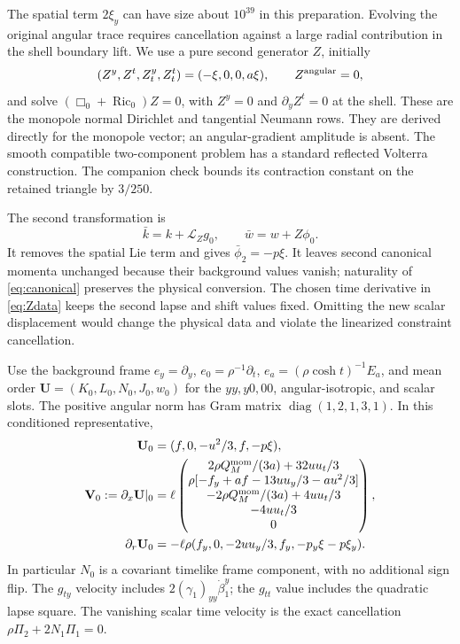 \documentclass[11pt]{article}
\newcommand{\Lie}{\mathcal L}
\begin{document}
The spatial term $2\xi_y$ can have size about $10^{39}$ in this
preparation. Evolving the original angular trace requires cancellation
against a large radial contribution in the shell boundary lift. We use
a pure second generator $Z$, initially
\begin{equation}
 (Z^y,Z^t,Z^y_t,Z^t_t)=(-\xi,0,0,a\xi),\qquad Z^{\rm angular}=0,
 \label{eq:Zdata}
\end{equation}
and solve $(\Box_0+\operatorname{Ric}_0)Z=0$, with
$Z^y=0$ and $\partial_yZ^t=0$ at the shell. These are the monopole
normal Dirichlet and tangential Neumann rows. They are derived directly
for the monopole vector; an angular-gradient amplitude is absent.
The smooth compatible two-component problem has a standard reflected
Volterra construction. The companion check bounds its contraction
constant on the retained triangle by $3/250$.

The second transformation is
\begin{equation}
 \bar k=k+\Lie_Zg_0,\qquad \bar w=w+Z\phi_0. \label{eq:secondgauge}
\end{equation}
It removes the spatial Lie term and gives $\bar\phi_2=-p\xi$.
It leaves second canonical momenta unchanged because their background
values vanish; naturality of \eqref{eq:canonical} preserves the physical
conversion. The chosen time derivative in \eqref{eq:Zdata} keeps the
second lapse and shift values fixed. Omitting the new scalar displacement
would change the physical data and violate the linearized constraint
cancellation.

Use the background frame $e_y=\partial_y$, $e_0=\rho^{-1}\partial_t$,
$e_a=(\rho\cosh t)^{-1}E_a$, and mean order
$\mathbf U=(K_0,L_0,N_0,J_0,w_0)$ for the $yy,y0,00$, angular-isotropic,
and scalar slots. The positive angular norm has Gram matrix
$\operatorname{diag}(1,2,1,3,1)$. In this conditioned representative,
\begin{align}
 \mathbf U_0&=(f,0,-u^2/3,f,-p\xi), \label{eq:U0}\\
 \mathbf V_0:=\partial_x\mathbf U|_0
 &=\ell\begin{pmatrix}
 2\rho Q_M^{\rm mom}/(3a)+32uu_t/3\\
 \rho[-f_y+af-13uu_y/3-au^2/3]\\
 -2\rho Q_M^{\rm mom}/(3a)+4uu_t/3\\
 -4uu_t/3\\0
 \end{pmatrix},\label{eq:V0}\\
 \partial_r\mathbf U_0&=-\ell\rho(f_y,0,-2uu_y/3,f_y,-p_y\xi-p\xi_y).
 \label{eq:U0r}
\end{align}
In particular $N_0$ is a covariant timelike frame component, with no
additional sign flip. The $g_{ty}$ velocity includes
$2(\gamma_1)_{yy}\dot\beta_1^y$; the $g_{tt}$ value includes the
quadratic lapse square. The vanishing scalar time velocity is the exact
cancellation $\rho\Pi_2+2N_1\Pi_1=0$.
\end{document}
